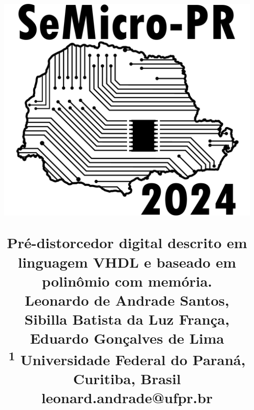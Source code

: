 \renewcommand{\thesubsection}{\Alph{subsection}}
\renewcommand{\thesection}{\Roman{section}}
\renewcommand{\figurename}{Fig.}
\renewcommand{\tablename}{TABELA}
\graphicspath{{Figuras/}}
\usepackage{geometry}
 \geometry{
     a4paper,
     left=16mm,
     top=19mm,
     right=16mm,
     bottom=25.4mm
 }
\title{
    \begin{minipage}[c]{0.3\textwidth} 
          \includegraphics[width=\textwidth]{Semicro_title.png} 
    \end{minipage}\begin{minipage}[c]{0.7\textwidth} 
             \begin{center}
                \Huge
                 Pré-distorcedor digital descrito em linguagem VHDL e baseado em polinômio com memória.\\
                \vspace{20pt}
                \Large
                  Leonardo de Andrade Santos, Sibilla Batista da Luz França, Eduardo Gonçalves de Lima \\
                  \normalsize
                  \textsuperscript{1} Universidade Federal do Paraná, Curitiba, Brasil \\
                  leonard.andrade@ufpr.br
             \end{center}
    \end{minipage}
}

\date{\vspace{-8em}}
\setlength\columnsep{2em}

